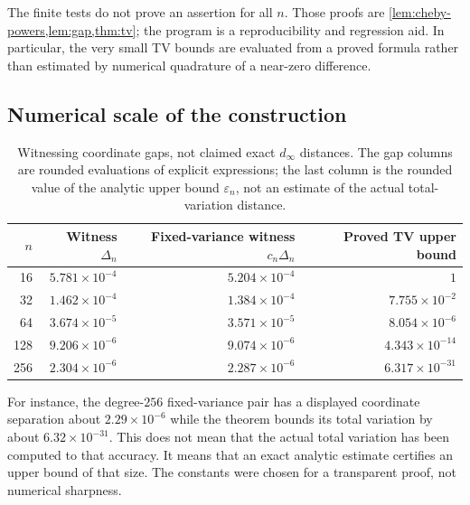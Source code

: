 \documentclass[11pt,a4paper]{article}
\theoremstyle{definition}
\theoremstyle{remark}
\newcommand{\eps}{\varepsilon}
\begin{document}
The finite tests do not prove an assertion for all $n$. Those proofs are
\cref{lem:cheby-powers,lem:gap,thm:tv}; the program is a reproducibility
and regression aid. In particular, the very small TV bounds are evaluated
from a proved formula rather than estimated by numerical quadrature of a
near-zero difference.

\subsection{Numerical scale of the construction}

\begin{table}[htbp]
\centering
\small
\begin{tabular}{@{}rrrr@{}}
\toprule
$n$ & Witness $\Delta_n$ & Fixed-variance witness $c_n\Delta_n$
    & Proved TV upper bound\\
\midrule
16 & $5.781\times 10^{-4}$ & $5.204\times 10^{-4}$ & $1$ \\
32 & $1.462\times 10^{-4}$ & $1.384\times 10^{-4}$ & $7.755\times 10^{-2}$ \\
64 & $3.674\times 10^{-5}$ & $3.571\times 10^{-5}$ & $8.054\times 10^{-6}$ \\
128 & $9.206\times 10^{-6}$ & $9.074\times 10^{-6}$ & $4.343\times 10^{-14}$ \\
256 & $2.304\times 10^{-6}$ & $2.287\times 10^{-6}$ & $6.317\times 10^{-31}$ \\

\bottomrule
\end{tabular}
\caption{Witnessing coordinate gaps, not claimed exact $d_\infty$ distances.
The gap columns are rounded evaluations of explicit expressions; the last
column is the rounded value of the analytic upper bound $\eps_n$, not an
estimate of the actual total-variation distance.}
\label{tab:numeric}
\end{table}

For instance, the degree-$256$ fixed-variance pair has a displayed
coordinate separation about $2.29\times10^{-6}$ while the theorem bounds
its total variation by about $6.32\times10^{-31}$. This does not mean
that the actual total variation has been computed to that accuracy. It
means that an exact analytic estimate certifies an upper bound of that
size. The constants were chosen for a transparent proof, not numerical
sharpness.
\end{document}
